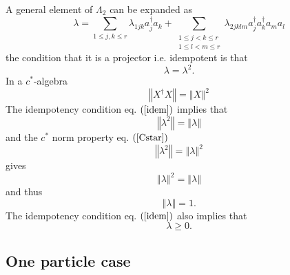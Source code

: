 \documentclass[aps,preprint]{revtex4}%
\begin{document}
A general element of $\Lambda_{2}$ can be expanded as
\begin{equation}
\lambda=\sum_{1\leq j,k\leq r}\lambda_{1jk}a_{j}^{\dagger}a_{k}+\sum
_{\substack{1\leq j<k\leq r\\1\leq l<m\leq r}}\lambda_{2jklm}a_{j}^{\dagger
}a_{k}^{\dagger}a_{m}a_{l}%
\end{equation}
the condition that it is a projector i.e. idempotent is that%
\begin{equation}
\lambda=\lambda^{2}. \label{idem}%
\end{equation}
In a $c^{\ast}$-algebra
\begin{equation}
\left\Vert X^{\dagger}X\right\Vert =\left\Vert X\right\Vert ^{2} \label{Cstar}%
\end{equation}
The idempotency condition eq. $\left(  \ref{idem}\right)  $ implies that
\begin{equation}
\left\Vert \lambda^{2}\right\Vert =\left\Vert \lambda\right\Vert
\end{equation}
and the $c^{\ast}$ norm property eq. $\left(  \ref{Cstar}\right)  $%
\begin{equation}
\left\Vert \lambda^{2}\right\Vert =\left\Vert \lambda\right\Vert ^{2}%
\end{equation}
gives
\begin{equation}
\left\Vert \lambda\right\Vert ^{2}=\left\Vert \lambda\right\Vert
\end{equation}
and thus
\begin{equation}
\left\Vert \lambda\right\Vert =1.
\end{equation}
The idempotency condition eq. $\left(  \ref{idem}\right)  $ also implies that
\begin{equation}
\lambda\geq0.
\end{equation}


\subsection{One particle case}
\end{document}
